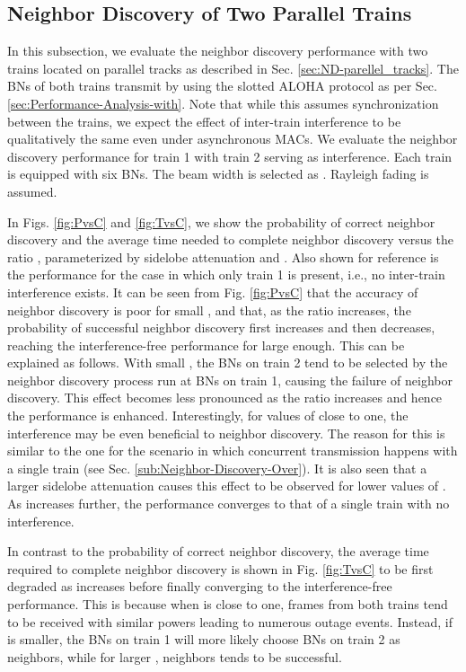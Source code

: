 \documentclass[10pt,english,two column]{IEEEtran}
\begin{document}
\subsection{Neighbor Discovery of Two Parallel Trains}

In this subsection, we evaluate the neighbor discovery performance
with two trains located on parallel tracks as described in Sec. \ref{sec:ND-parellel_tracks}.
The BNs of both trains transmit by using the slotted ALOHA protocol
as per Sec. \ref{sec:Performance-Analysis-with}. Note that while
this assumes synchronization between the trains, we expect the effect
of inter-train interference to be qualitatively the same even under
asynchronous MACs. We evaluate the neighbor discovery performance
for train 1 with train 2 serving as interference. Each train is equipped
with six BNs. The beam width  is selected as .
Rayleigh fading is assumed. 

In Figs. \ref{fig:PvsC} and \ref{fig:TvsC}, we show the probability
of correct neighbor discovery and the average time needed to complete
neighbor discovery versus the ratio , parameterized by
sidelobe attenuation  and .
Also shown for reference is the performance for the case in which
only train 1 is present, i.e., no inter-train interference exists.
It can be seen from Fig. \ref{fig:PvsC} that the accuracy of neighbor
discovery is poor for small , and that, as the ratio 
increases, the probability of successful neighbor discovery first
increases and then decreases, reaching the interference-free performance
for  large enough. This can be explained as follows. With
small , the BNs on train 2 tend to be selected by the neighbor
discovery process run at BNs on train 1, causing the failure of neighbor
discovery. This effect becomes less pronounced as the ratio 
increases and hence the performance is enhanced. Interestingly, for
values of  close to one, the interference may be even beneficial
to neighbor discovery. The reason for this is similar to the one for
the scenario in which concurrent transmission happens with a single
train (see Sec. \ref{sub:Neighbor-Discovery-Over}). It is also seen
that a larger sidelobe attenuation causes this effect to be observed
for lower values of . As  increases further,
the performance converges to that of a single train with no interference. 

In contrast to the probability of correct neighbor discovery, the
average time required to complete neighbor discovery is shown in Fig.
\ref{fig:TvsC} to be first degraded as  increases before
finally converging to the interference-free performance. This is because
when  is close to one, frames from both trains tend to
be received with similar powers leading to numerous outage events.
Instead, if  is smaller, the BNs on train 1 will more likely
choose BNs on train 2 as neighbors, while for larger ,
neighbors tends to be successful.
\end{document}
